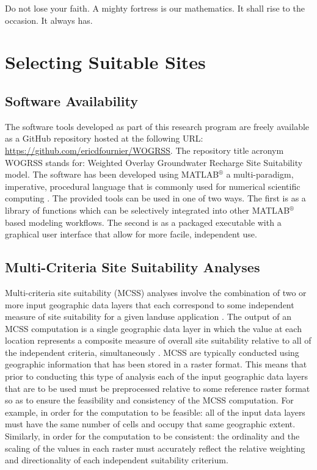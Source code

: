 \begin{savequote}[75mm]
Do not lose your faith. A mighty fortress is our mathematics. It shall rise to the occasion. It always has. 
\end{savequote}

\chapter{Selecting Suitable Sites}
\label{chapter 1}

\newpage

\section{Software Availability}

The software tools developed as part of this research program are freely available as a GitHub repository hosted at the following URL: \url{https://github.com/ericdfournier/WOGRSS}. The repository title acronym WOGRSS stands for: Weighted Overlay Groundwater Recharge Site Suitability model. The software has been developed using MATLAB$^{\circledR}$ a multi-paradigm, imperative, procedural language that is commonly used for numerical scientific computing \cite{MATLAB2013}. The provided tools can be used in one of two ways. The first is as a library of functions which can be selectively integrated into other MATLAB$^{\circledR}$ based modeling workflows. The second is as a packaged executable with a graphical user interface that allow for more facile, independent use. 
 
\section{Multi-Criteria Site Suitability Analyses}

Multi-criteria site suitability (MCSS) analyses involve the combination of two or more input geographic data layers that each correspond to some independent measure of site suitability for a given landuse application \cite{Bolstad2005}. The output of an MCSS computation is a single geographic data layer in which the value at each location represents a composite measure of overall site suitability relative to all of the independent criteria, simultaneously \cite{Hopkins1977, Collins2001}. MCSS are typically conducted using geographic information that has been stored in a raster format. This means that prior to conducting this type of analysis each of the input geographic data layers that are to be used must be preprocessed relative to some reference raster format so as to ensure the feasibility and consistency of the MCSS computation. For example, in order for the computation to be feasible: all of the input data layers must have the same number of cells and occupy that same geographic extent. Similarly, in order for the computation to be consistent: the ordinality and the scaling of the values in each raster must accurately reflect the relative weighting and directionality of each independent suitability criterium.
 
